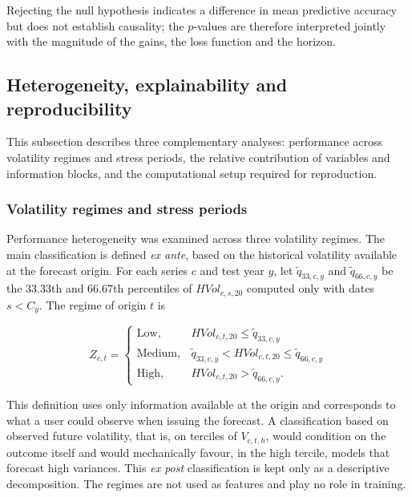 \documentclass[a4paper,fleqn]{cas-sc}
\begin{document}
Rejecting the null hypothesis indicates a difference in mean predictive accuracy but does not establish causality; the \(p\)-values are therefore interpreted jointly with the magnitude of the gains, the loss function and the horizon.

\subsection{Heterogeneity, explainability and reproducibility}
\label{subsec:additional_analyses}

This subsection describes three complementary analyses: performance across volatility regimes and stress periods, the relative contribution of variables and information blocks, and the computational setup required for reproduction.

\subsubsection{Volatility regimes and stress periods}
\label{subsec:regimes}

Performance heterogeneity was examined across three volatility regimes. The main classification is defined \textit{ex ante}, based on the historical volatility available at the forecast origin. For each series \(c\) and test year \(y\), let \(\tilde q_{33,c,y}\) and \(\tilde q_{66,c,y}\) be the 33.33th and 66.67th percentiles of \(HVol_{c,s,20}\) computed only with dates \(s<C_y\). The regime of origin \(t\) is

\begin{equation}
Z_{c,t}
=
\begin{cases}
\mathrm{Low}, & HVol_{c,t,20}\leq \tilde q_{33,c,y} \\
\mathrm{Medium}, & \tilde q_{33,c,y}<HVol_{c,t,20}\leq \tilde q_{66,c,y} \\
\mathrm{High}, & HVol_{c,t,20}>\tilde q_{66,c,y}.
\end{cases}
\label{eq:regimes}
\end{equation}

This definition uses only information available at the origin and corresponds to what a user could observe when issuing the forecast. A classification based on observed future volatility, that is, on terciles of \(V_{c,t,h}\), would condition on the outcome itself and would mechanically favour, in the high tercile, models that forecast high variances. This \textit{ex post} classification is kept only as a descriptive decomposition. The regimes are not used as features and play no role in training.
\end{document}
